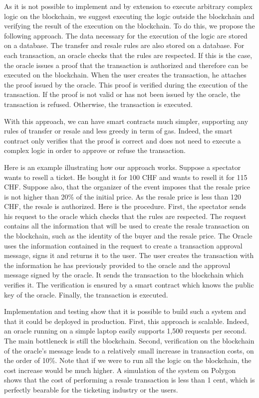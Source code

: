 \documentclass[a4paper,11pt,oneside]{report}
\begin{document}
As it is not possible to implement and by extension to execute arbitrary complex logic on the blockchain, we suggest executing the logic outside the blockchain and verifying the result of the execution on the blockchain. To do this, we propose the following approach. The data necessary for the execution of the logic are stored on a database. The transfer and resale rules are also stored on a database. For each transaction, an oracle checks that the rules are respected. If this is the case, the oracle issues a proof that the transaction is authorized and therefore can be executed on the blockchain. When the user creates the transaction, he attaches the proof issued by the oracle. This proof is verified during the execution of the transaction. If the proof is not valid or has not been issued by the oracle, the transaction is refused. Otherwise, the transaction is executed.

With this approach, we can have smart contracts much simpler, supporting any rules of transfer or resale and less greedy in term of gas. Indeed, the smart contract only verifies that the proof is correct and does not need to execute a complex logic in order to approve or refuse the transaction.

Here is an example illustrating how our approach works. Suppose a spectator wants to resell a ticket. He bought it for 100 CHF and wants to resell it for 115 CHF. Suppose also, that the organizer of the event imposes that the resale price is not higher than 20\% of the initial price. As the resale price is less than 120 CHF, the resale is authorized. Here is the procedure. First, the spectator sends his request to the oracle which checks that the rules are respected. The request contains all the information that will be used to create the resale transaction on the blockchain, such as the identity of the buyer and the resale price. The Oracle uses the information contained in the request to create a transaction approval message, signs it and returns it to the user. The user creates the transaction with the information he has previously provided to the oracle and the approval message signed by the oracle. It sends the transaction to the blockchain which verifies it. The verification is ensured by a smart contract which knows the public key of the oracle. Finally, the transaction is executed.

Implementation and testing show that it is possible to build such a system and that it could be deployed in production. First, this approach is scalable. Indeed, an oracle running on a simple laptop easily supports 1,500 requests per second. The main bottleneck is still the blockchain. Second, verification on the blockchain of the oracle's message leads to a relatively small increase in transaction costs, on the order of 10\%. Note that if we were to run all the logic on the blockchain, the cost increase would be much higher. A simulation of the system on Polygon shows that the cost of performing a resale transaction is less than 1 cent, which is perfectly bearable for the ticketing industry or the users.
\end{document}
